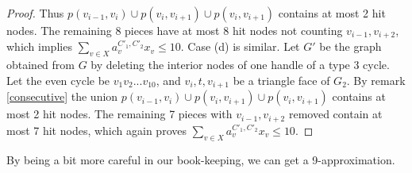 \documentclass{article}
\newcommand{\0}{\mathbb{0}}
\newcommand{\1}{\mathbb{1}}
\begin{document}
\begin{proof}
Thus $p(v_{i-1},v_i) \cup p(v_{i},v_{i+1}) \cup p(v_{i},v_{i+1})$ contains at most 2 hit nodes. The remaining 8 pieces have at most 8 hit nodes not counting $v_{i-1},v_{i+2}$, which implies $\sum_{v \in X} a^{C'_1,C'_2}_v x_v \leq 10$.  Case (d) is similar. Let $G'$ be the graph obtained from $G$ by deleting the interior nodes of one handle of a type 3 cycle. Let the even cycle be $v_1 v_2 ... v_{10}$, and $v_i,t,v_{i+1}$ be a triangle face of $G_2$. By remark \ref{consecutive} the union  $p(v_{i-1},v_i) \cup p(v_{i},v_{i+1}) \cup p(v_{i},v_{i+1})$ contains at most 2 hit nodes. The remaining 7 pieces with $v_{i-1},v_{i+2}$ removed contain at most 7 hit nodes,  which again proves $\sum_{v \in X} a^{C'_1,C'_2}_v x_v \leq 10$. 
 \end{proof}
 By being a bit more careful in our book-keeping, we can get a 9-approximation.
 
\end{document}
